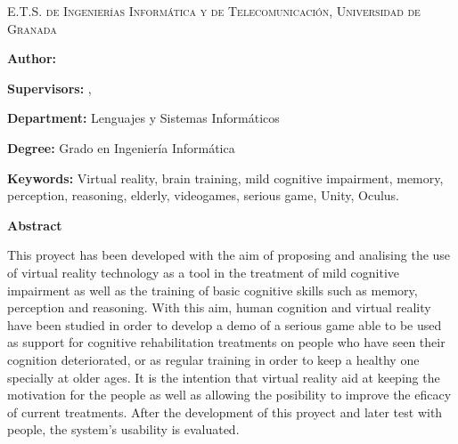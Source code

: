 
\pagestyle{fancy}

\begin{center}
	\scshape
	E.T.S. de Ingenierías Informática y de Telecomunicación, Universidad de Granada
\end{center}

\bigskip

\begin{center}
	\Large \scshape
	\textbf{\tfgtitlenameENG}
\end{center}

\bigskip \bigskip \bigskip

\begin{minipage}{\textwidth}

\textbf{Author:} \tfgauthorname

\medskip

\textbf{Supervisors:} \tfgtutornameA , \tfgtutornameB

\medskip


\medskip

\textbf{Department:} Lenguajes y Sistemas Informáticos

\medskip

\textbf{Degree:} Grado en Ingeniería Informática

\medskip

\textbf{Keywords:} Virtual reality, brain training, mild cognitive impairment, memory, perception, reasoning, elderly, videogames, serious game, Unity, Oculus.

\bigskip \bigskip


\end{minipage}

\begin{center}
	\textbf{Abstract}
\end{center}



This proyect has been developed with the aim of proposing and analising the use of virtual reality technology as a tool in the treatment of mild cognitive impairment as well as the training of basic cognitive skills such as memory, perception and reasoning. With this aim, human cognition and virtual reality have been studied in order to develop a demo of a serious game able to be used as support for cognitive rehabilitation treatments on people who have seen their cognition deteriorated, or as regular training in order to keep a healthy one specially at older ages. It is the intention that virtual reality aid at keeping the motivation for the people as well as allowing the posibility to improve the eficacy of current treatments. After the development of this proyect and later test with people, the system's usability is evaluated.



\blankpage
